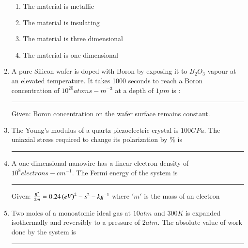 \documentclass[journal]{IEEEtran}
\numberwithin{equation}{enumi}
\numberwithin{figure}{enumi}
\begin{document}
\begin{enumerate}
		\begin{figure}[H]
			\centering
			\resizebox{0.6\textwidth}{!}{}
		\end{figure}

		\hfill{}

		\begin{enumerate}
			\item The material is metallic
			\item The material is insulating
			\item The material is three dimensional
			\item The material is one dimensional
		\end{enumerate}

	\item A pure Silicon wafer is doped with Boron by exposing it to $B_2O_3$ vapour at an elevated temperature. It takes 1000 seconds to reach a Boron concentration of $10^{20} atoms-m^{-3}$ at a depth of $1\mu m$ is :\rule{1cm}{0.1pt} 

		Given: Boron concentration on the wafer surface remains constant.

		\hfill{}

	\item The Young's modulus of a quartz piezoelectric crystal is $100GPa$. The uniaxial stress required to change its polarization by $\%$ is \rule{1cm}{0.1pt}  

		\hfill{}

	\item A one-dimensional nanowire has a linear electron density of $10^8 electrons-cm^{-1}$. The Fermi energy of the system is \rule{1cm}{0.1pt} 

		Given: $\frac{\hbar^2}{2m} = 0.24\left(eV\right)^2-s^2-kg^{-1}$ where $'m'$ is the mass of an electron

		\hfill{}

	\item Two moles of a monoatomic ideal gas at $10 atm$ and $300 K$ is expanded isothermally and reversibly to a pressure of $2 atm$. The absolute value of work done by the system is  \rule{1cm}{0.1pt} 


\end{enumerate}
\end{document}
